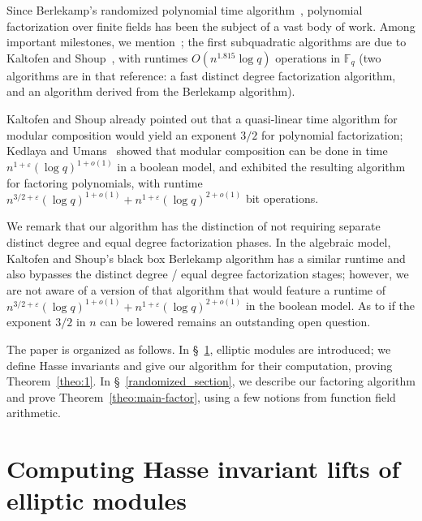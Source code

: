 \documentclass[12pt]{article}
\theoremstyle{plain}
\theoremstyle{definition}
\def\F{\ensuremath{\mathbb{F}}}
\begin{document}
Since Berlekamp's randomized polynomial time algorithm~\cite{ber},
polynomial factorization over finite fields has been the subject of a
vast body of work. Among important milestones, we
mention~\cite{cz,gs}; the first subquadratic algorithms are due to
Kaltofen and Shoup~\cite{ks}, with runtimes $O(n^{1.815}\log q)$
operations in $\F_q$  (two algorithms are in that reference:
a fast distinct degree factorization algorithm, and an algorithm
derived from the Berlekamp algorithm).

Kaltofen and Shoup already pointed out that a quasi-linear time
algorithm for modular composition would yield an exponent $3/2$ for
polynomial factorization; Kedlaya and Umans~\cite{ku} showed that
modular composition can be done in time $n^{1+\varepsilon} (\log
q)^{1+o(1)}$ in a boolean model, and exhibited the resulting
algorithm for factoring polynomials, with runtime $n^{3/2+\varepsilon}
(\log q)^{1 +o(1)} + n^{1+\varepsilon}(\log q)^{2+o(1)}$ bit
operations. 

We remark that our algorithm has the distinction of not requiring
separate distinct degree and equal degree factorization phases. In the
algebraic model, Kaltofen and Shoup's black box Berlekamp algorithm
has a similar runtime and also bypasses the distinct degree / equal
degree factorization stages; however, we are not aware of a version of
that algorithm that would feature a runtime of $n^{3/2+\varepsilon} (\log q)^{1 +o(1)} +
n^{1+\varepsilon}(\log q)^{2+o(1)}$ in the boolean model.
As to if the exponent $3/2$ in $n$ can be lowered remains an
outstanding open question.


The paper is organized as follows. In \S~\ref{drinfeld_section},
elliptic modules are introduced; we define Hasse invariants and give
our algorithm for their computation, proving Theorem~\ref{theo:1}.  In
\S~\ref{randomized_section}, we describe our factoring algorithm and
prove Theorem~\ref{theo:main-factor}, using a few notions from
function field arithmetic.

 

\section{Computing Hasse invariant lifts of elliptic modules}\label{drinfeld_section}

\end{document}
